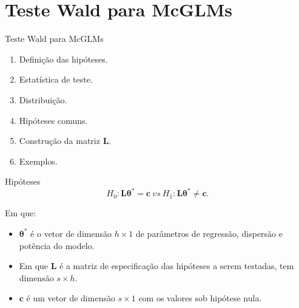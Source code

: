 \documentclass[
  ignorenonframetext,
  serif,
  professionalfont,
  usenames,
  dvipsnames,
  aspectratio = 169]{beamer}
\begin{document}
\hypertarget{teste-wald-para-mcglms}{%
\section{Teste Wald para McGLMs}\label{teste-wald-para-mcglms}}

\begin{frame}{Teste Wald para McGLMs}
\begin{enumerate}
  \itemsep 2ex
    
  \item Definição das hipóteses.
  \item Estatística de teste.
  \item Distribuição.
  \item Hipóteses comuns.
  \item Construção da matriz $\boldsymbol{L}$.
  \item Exemplos.
  
\end{enumerate}
\end{frame}

\begin{frame}{Hipóteses}
\protect\hypertarget{hipuxf3teses}{}
\[H_0: \boldsymbol{L}\boldsymbol{\theta^{*}} = \boldsymbol{c} \ vs \ H_1: \boldsymbol{L}\boldsymbol{\theta^{*}} \neq \boldsymbol{c}.\]

Em que:

\begin{itemize}
  
  \item $\boldsymbol{\theta^{*}}$ é o vetor de dimensão $h \times 1$ de parâmetros de regressão, dispersão e potência do modelo. 
  
  \item Em que $\boldsymbol{L}$ é a matriz de especificação das hipóteses a serem testadas, tem dimensão $s \times h$. 
  
  \item $\boldsymbol{c}$ é um vetor de dimensão $s \times 1$ com os valores sob hipótese nula.

\end{itemize}
\end{frame}
\end{document}
